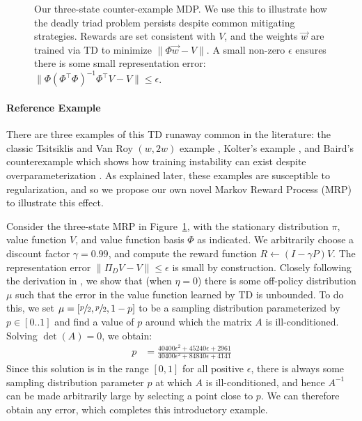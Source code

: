 \documentclass[11pt]{article}
\begin{document}
\label{sec:deadlytriadnaive}
\begin{figure}[!p]
  
  \caption{Our three-state counter-example MDP. We use this to illustrate how the deadly triad problem persists despite common mitigating strategies. Rewards are set consistent with $V$, and the weights $\vec w$ are trained via TD to minimize $\|\Phi \vec w - V \|$. A small non-zero $\epsilon$ ensures there is some small representation error: $\|\Phi(\Phi^\top \Phi)^{-1}\Phi^\top V - V \| \leq \epsilon$. }
  \label{fig:mdp}
\end{figure}

\paragraph{Reference Example} There are three examples of this TD runaway common in the literature: the classic Tsitsiklis and Van Roy $(w, 2w)$ example \cite[p.~260]{sutton2020reinforcement}, Kolter's example \cite{kolter2011fixed}, and Baird's counterexample which shows how training instability can exist despite overparameterization \cite{baird1993counterexample}. As explained later, these examples are susceptible to regularization, and so we propose our own novel Markov Reward Process (MRP) to illustrate this effect.

Consider the three-state MRP in Figure~\ref{fig:mdp}, with the stationary distribution $\pi$, value function $V$, and value function basis $\Phi$ as indicated. We arbitrarily choose a discount factor $\gamma = 0.99$, and compute the reward function $R \gets (I-\gamma P)V$. The representation error $\|\Pi_D V - V\| \leq \epsilon$ is small by construction.
Closely following the derivation in \cite{kolter2011fixed}, we show that (when $\eta=0$) there is some off-policy distribution $\mu$ such that the error in the value function learned by TD is unbounded. To do this, we set $\mu = [\sfrac p2, \sfrac p2, 1-p]$ to be a sampling distribution parameterized by $p \in [0..1]$ and find a value of $p$ around which the matrix $A$ is ill-conditioned. Solving $\det(A) = 0$, we obtain:
\begin{align}
  p & = \frac{40400\epsilon^2 + 45240\epsilon + 2961}{40400\epsilon^2 + 84840\epsilon + 4141}\label{eqn:simplep}
\end{align}
Since this solution is in the range $[0, 1]$ for all positive $\epsilon$, there is always some sampling distribution parameter $p$ at which $A$ is ill-conditioned, and hence $A^{-1}$ can be made arbitrarily large by selecting a point close to $p$. We can therefore obtain any error, which completes this introductory example.
\end{document}

